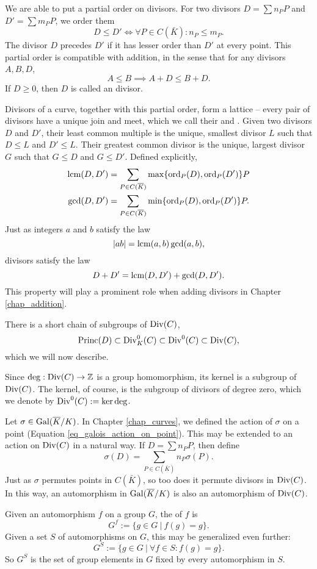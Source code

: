 We are able to put a partial order on divisors.
For two divisors $D = \sum n_P P$ and $D' = \sum m_P P$,
we order them
  \[ D \leq D' \iff \forall P \in C(\bar K) : n_P \leq m_P. \]
The divisor $D$ precedes $D'$ if it has lesser order than $D'$ at every point.
This partial order is compatible with addition, in the sense that for any divisors $A, B, D$,
  \[ A \leq B \implies A + D \leq B + D. \]
If $D \geq 0$, then $D$ is called an  divisor.

Divisors of a curve, together with this partial order, form a lattice --
every pair of divisors have a unique join and meet,
which we call their  and .
Given two divisors $D$ and $D'$, their least common multiple is the unique, smallest divisor $L$ such that $D \leq L$ and $D' \leq L$.
Their greatest common divisor is the unique, largest divisor $G$ such that $G \leq D$ and $G \leq D'$.
Defined explicitly,
\begin{align*}
  \operatorname{lcm}(D, D') &= \sum_{P \in C(\overline K)}\max\{\operatorname{ord}_P(D), \operatorname{ord}_P(D')\}P \\
  \gcd(D, D') &= \sum_{P \in C(\overline K)}\min\{\operatorname{ord}_P(D), \operatorname{ord}_P(D')\}P.
\end{align*}
Just as integers $a$ and $b$ satisfy the law
  \[ \left| ab \right| = \operatorname{lcm}(a,b)\gcd(a,b), \]
divisors satisfy the law
  \[ D + D' = \operatorname{lcm}(D, D') + \gcd(D, D'). \]
This property will play a prominent role when adding divisors in Chapter \ref{chap_addition}.

There is a short chain of subgroups of $\operatorname{Div}(C)$,
\[ \operatorname{Princ}(D) \subset \operatorname{Div}_K^0(C) \subset \operatorname{Div}^0(C) \subset \operatorname{Div}(C), \]
which we will now describe.

Since $\deg : \operatorname{Div}(C) \to \mathbb{Z}$ is a group homomorphism, its kernel is a subgroup of $\operatorname{Div}(C)$.
The kernel, of course, is the subgroup of divisors of degree zero, which we denote by $\operatorname{Div}^0(C) := \ker \deg$.

Let $\sigma \in \operatorname{Gal}(\overline K / K)$.
In Chapter \ref{chap_curves}, we defined the action of $\sigma$ on a point (Equation \ref{eq_galois_action_on_point}).
This may be extended to an action on $\operatorname{Div}(C)$ in a natural way.
If $D = \sum n_P P$, then define
\[ \sigma(D) = \sum_{P \in C(\bar K)} n_P \sigma(P). \]
Just as $\sigma$ permutes points in $C(\bar K)$, so too does it permute divisors in $\operatorname{Div}(C)$.
In this way, an automorphism in $\operatorname{Gal}(\overline K/K)$ is also an automorphism of $\operatorname{Div}(C)$.

Given an automorphism $f$ on a group $G$, the  of $f$ is
  \[ G^f := \{ g \in G ~|~ f(g) = g \}. \]
Given a set $S$ of automorphisms on $G$, this may be generalized even further:
  \[ G^S := \{ g \in G ~|~ \forall f \in S : f(g) = g \}. \]
So $G^S$ is the set of group elements in $G$ fixed by every automorphism in $S$.

